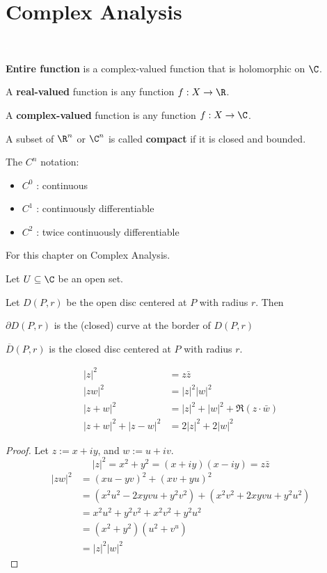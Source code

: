 \section{Complex Analysis}\label{f28d4dc}

\label{d508dc8}

\textcolor{white}{.}

\textbf{Entire function} is a complex-valued function that is holomorphic on
$\C$.

A \textbf{real-valued} function is any function $f:X\to\R$.

A \textbf{complex-valued} function is any function $f:X\to\C$.

A subset of $\R^n$ or $\C^n$ is called \textbf{compact} if it is closed and
bounded.

The $C^n$ notation:
\begin{itemize}
  \item $C^0$ : continuous
  \item $C^1$ : continuously differentiable
  \item $C^2$ : twice continuously differentiable
\end{itemize}

\label{d1055b9}

For this chapter on Complex Analysis.

Let $U\subseteq\C$ be an open set.

Let $D(P,r)$ be the open disc centered at $P$ with radius $r$. Then
\begin{enumerati}
  \item $\partial D(P,r)$ is the (closed) curve at the border of $D(P,r)$
  \item $\overline D(P,r)$ is the closed disc centered at $P$ with
  radius $r$.
\end{enumerati}

\label{adebe9e}

\begin{align*}
  |z|^2           & =z\bar z                       \\
  |zw|^2          & =|z|^2|w|^2                    \\
  |z+w|^2         & =|z|^2+|w|^2+\Re(z\cdot\bar w) \\
  |z+w|^2+|z-w|^2 & =2|z|^2+2|w|^2
\end{align*}

\begin{proof}
  Let $z:=x+iy$, and $w:=u+iv$.
  $$
    |z|^2=x^2+y^2=(x+iy)(x-iy)=z\bar z
  $$
  \begin{align*}
    |zw|^2
     & = (xu-yv)^2+(xv+yu)^2                        \\
     & =(x^2u^2-2xyvu+y^2v^2)+(x^2v^2+2xyvu+y^2u^2) \\
     & =x^2u^2+y^2v^2+x^2v^2+y^2u^2                 \\
     & =(x^2+y^2)(u^2+v^u)                          \\
     & =|z|^2|w|^2
  \end{align*}
\end{proof}

